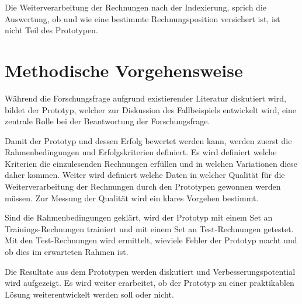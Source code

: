 \documentclass{hwz}
\begin{document}
Die Weiterverarbeitung der Rechnungen nach der Indexierung, sprich die Auswertung, ob und wie eine bestimmte Rechnungsposition versichert ist, ist nicht Teil des Prototypen.


\newpage
\section{Methodische Vorgehensweise}


Während die Forschungsfrage aufgrund existierender Literatur diskutiert wird, bildet der Prototyp, welcher zur Diskussion des Fallbeispiels entwickelt wird, eine zentrale Rolle bei der Beantwortung der Forschungsfrage.

Damit der Prototyp und dessen Erfolg bewertet werden kann, werden zuerst die Rahmenbedingungen und Erfolgskriterien definiert. Es wird definiert welche Kriterien die einzulesenden Rechnungen erfüllen und in welchen Variationen diese daher kommen. Weiter wird definiert welche Daten in welcher Qualität für die Weiterverarbeitung der Rechnungen durch den Prototypen gewonnen werden müssen. Zur Messung der Qualität wird ein klares Vorgehen bestimmt.

Sind die Rahmenbedingungen geklärt, wird der Prototyp mit einem Set an Trainings-Rechnungen trainiert und mit einem Set an Test-Rechnungen getestet. Mit den Test-Rechnungen wird ermittelt, wieviele Fehler der Prototyp macht und ob dies im erwarteten Rahmen ist.

Die Resultate aus dem Prototypen werden diskutiert und Verbesserungspotential wird aufgezeigt. Es wird weiter erarbeitet, ob der Prototyp zu einer praktikablen Lösung weiterentwickelt werden soll oder nicht.
\end{document}
